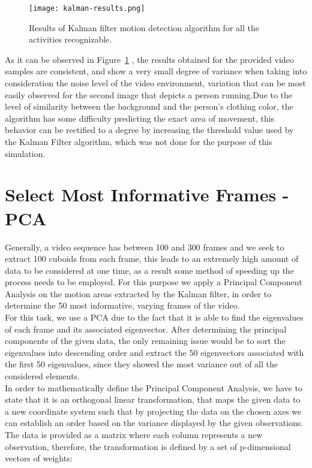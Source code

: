 \documentclass[11pt]{report}
\begin{document}
\begin{figure}
    \centering
    \texttt{[image: kalman-results.png]}
    \caption{Results of Kalman filter motion detection algorithm for all the activities recognizable.}
    \label{fig:kalman-results}
\end{figure}

As it can be observed in Figure~\ref{fig:kalman-results} , the results obtained for the provided video samples are consistent, and show a very small degree of variance when taking into consideration the noise level of the video environment, variation that can be most easily observed for the second image that depicts a person running.Due to the level of similarity between the background and the person's clothing color, the algorithm has some difficulty predicting the exact area of movement, this behavior can be rectified to a degree by increasing the threshold value used by the Kalman Filter algorithm, which was not done for the purpose of this simulation.\\

\section{Select Most Informative Frames - PCA}
Generally, a video sequence has between 100 and 300 frames and we seek to extract 100 cuboids from each frame, this leads to an extremely high amount of data to be considered at one time, as a result some method of speeding up the process needs to be employed. For this purpose we apply a Principal Component Analysis on the motion areas extracted by the Kalman filter, in order to determine the 50 most informative, varying frames of the video. \\
For this task, we use a PCA due to the fact that it is able to find the eigenvalues of each frame and its associated eigenvector. After determining the principal components of the given data, the only remaining issue would be to sort the eigenvalues into descending order and extract the 50 eigenvectors associated with the first 50 eigenvalues, since they showed the most variance out of all the considered elements.\\
In order to mathematically define the Principal Component Analysis, we have to state that it is an orthogonal linear transformation, that maps the given data to a new coordinate system such that by projecting the data on the chosen axes we can establish an order based on the variance displayed by the given observations. The data is provided as a matrix where each column represents a new observation, therefore, the transformation is defined by a set of p-dimensional vectors of weights:
\end{document}
